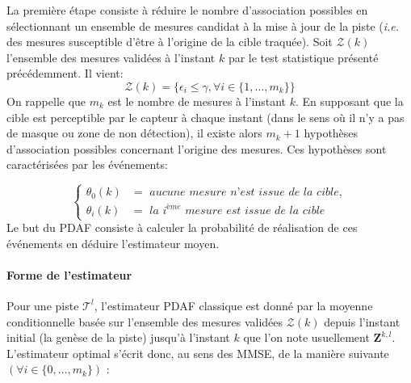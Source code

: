 \documentclass[10pt,french,a4paper]{report}
\begin{document}
			La première étape consiste à réduire le nombre d'association possibles en sélectionnant un ensemble de mesures candidat à la mise à jour de la piste (\textit{i.e.} des mesures susceptible d'être à l'origine de la cible traquée). 
			Soit $\mathcal{Z}(k)$ l'ensemble des mesures validées à l'instant $k$ par le test statistique présenté précédemment. Il vient:
				 	 					\begin{equation}
		 	 					\mathcal{Z}(k) = \{ \epsilon_i \leq \gamma, 	 					\forall i \in \{1,\ldots,m_k\}\}
							\end{equation}	
			On rappelle que $m_k$ est le nombre de mesures à l'instant $k$. En supposant que la cible est perceptible par le capteur à chaque instant (dans le sens où il n'y a pas de masque ou zone de non détection), il existe alors $m_k+1$ hypothèses d'association possibles concernant l'origine des mesures. Ces hypothèses sont caractérisées par les événements:
			
			\begin{equation}
	\left\{ \begin{aligned}
	\theta_0(k) &=\textit{ aucune mesure n'est issue de la cible},\\
	\theta_i(k) &=\textit{ la $i^{ème}$ mesure est issue de la cible}
	\end{aligned}
	\right.
	\end{equation}
			Le but du \ac{PDAF} consiste à calculer la probabilité de réalisation de ces événements en déduire l'estimateur moyen. 
			
			\paragraph{Forme de l'estimateur}
	Pour une piste $\mathcal{T}^l$, l'estimateur \ac{PDAF} classique est donné par la moyenne conditionnelle basée sur l'ensemble des mesures validées $\mathcal{Z}(k)$ depuis l'instant initial (la genèse de la piste) jusqu'à l'instant $k$ que l'on note usuellement $\mathbf{Z}^{k,l}$. L'estimateur optimal s'écrit donc, au sens des \acf{MMSE}, de la manière suivante $(\forall i \in \{0,\ldots,m_k\})$	:
	
\end{document}
